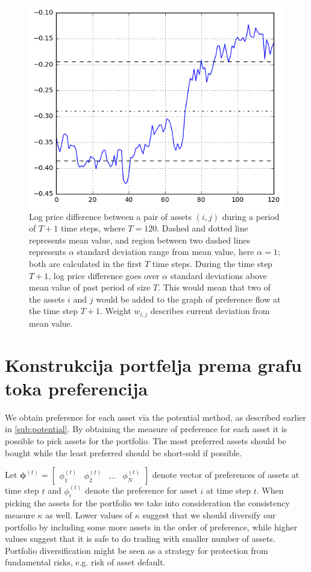 \documentclass[lmodern, utf8, diplomski, numeric]{fer}
\newcommand{\matr}[1]{\mathbold{#1}}
\begin{document}
  \begin{figure}[h]
    \centering
    \includegraphics[width=0.9\columnwidth]{graphics/deviation-magnitude.png}
    \caption{Log price difference between a pair of assets $(i, j)$ during a period of $T + 1$ time steps, where $T = 120$.
      Dashed and dotted line represents mean value, and region between two dashed lines represents $\alpha$ standard deviation range from mean value, here $\alpha = 1$; both are calculated in the first $T$ time steps.
      During the time step $T + 1$, log price difference goes over $\alpha$ standard deviations above mean value of past period of size $T$.
      This would mean that two of the assets $i$ and $j$ would be added to the graph of preference flow at the time step $T + 1$.
      Weight $w_{i,j}$ describes current deviation from mean value.}
    \label{fig:devmag}
  \end{figure}
  
  \section{Konstrukcija portfelja prema grafu toka preferencija}
  We obtain preference for each asset via the potential method, as described earlier in \ref{sub:potential}.
  By obtaining the measure of preference for each asset it is possible to pick assets for the portfolio.
  The most preferred assets should be bought while the least preferred should be short-sold if possible.
  
  Let $\matr{\phi}^{(t)} = \begin{bmatrix} \phi_1^{(t)} & \phi_2^{(t)} & \ldots & \phi_N^{(t)} \end{bmatrix}$ denote vector of preferences of assets at time step $t$ and $\phi_i^{(t)}$ denote the preference for asset $i$ at time step $t$.
  When picking the assets for the portfolio we take into consideration the consistency measure $\kappa$ as well.
  Lower values of $\kappa$ suggest that we should diversify our portfolio by including some more assets in the order of preference, while higher values suggest that it is safe to do trading with smaller number of assets.
  Portfolio diversification might be seen as a strategy for protection from fundamental risks, e.g. risk of asset default.
  
\end{document}
